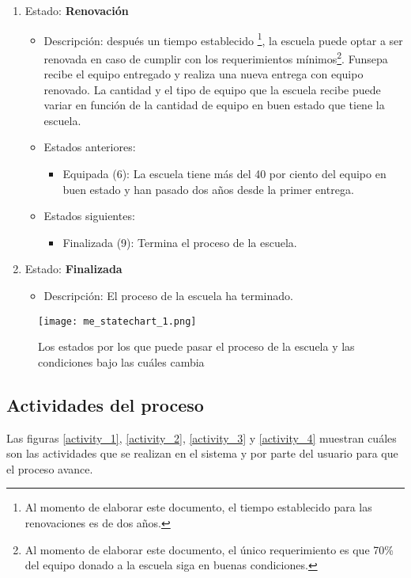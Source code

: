\documentclass[11pt]{report}
\begin{document}
\begin{enumerate}
		\item Estado: \textbf{Renovación}
		\begin{itemize}
			\item Descripción: después un tiempo establecido \footnote{Al momento de elaborar este documento, el tiempo establecido para las renovaciones es de dos años.}, la escuela puede optar a ser renovada en caso de cumplir con los requerimientos mínimos\footnote{Al momento de elaborar este documento, el único requerimiento es que 70\% del equipo donado a la escuela siga en buenas condiciones.}. Funsepa recibe el equipo entregado y realiza una nueva entrega con equipo renovado. La cantidad y el tipo de equipo que la escuela recibe puede variar en función de la cantidad de equipo en buen estado que tiene la escuela.
			\item Estados anteriores:
			\begin{itemize}
				\item Equipada (6): La escuela tiene más del 40 por ciento del equipo en buen estado y han pasado dos años desde la primer entrega.
			\end{itemize}
			\item Estados siguientes:
			\begin{itemize}
				\item Finalizada (9): Termina el proceso de la escuela.
			\end{itemize}
		\end{itemize}
		
		\item Estado: \textbf{Finalizada}
		\begin{itemize}
			\item Descripción: El proceso de la escuela ha terminado.
		\end{itemize}
		
	\end{enumerate}
	
	\begin{figure}[h]
		\centering
		\caption[Diagrama de estados]{Los estados por los que puede pasar el proceso de la escuela y las condiciones bajo las cuáles cambia}
		\label{state_1}
		\texttt{[image: me\_statechart\_1.png]}
	\end{figure}
	
	\subsection{Actividades del proceso}
	Las figuras \ref{activity_1}, \ref{activity_2}, \ref{activity_3} y \ref{activity_4} muestran cuáles son las actividades que se realizan en el sistema y por parte del usuario para que el proceso avance.
	
\end{document}
